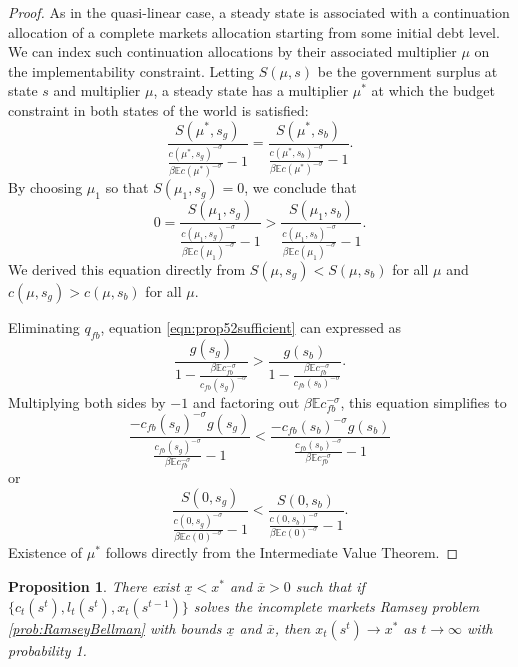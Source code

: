 \documentclass[12pt]{article}
\newcommand{\EE}{\mathbb E}
\newtheorem{proposition}[theorem]{Proposition}
\begin{document}
\begin{proof}As in the quasi-linear case, a steady state is associated with a continuation allocation of a complete markets allocation starting from  some initial debt level.  We can index such continuation allocations by their associated multiplier $\mu$ on the implementability constraint.  Letting $S(\mu,s)$ be the government surplus at state $s$ and multiplier $\mu$, a steady state has  a multiplier $\mu^*$ at which the budget constraint in both states of the world is satisfied:
\[
	\frac{S(\mu^*,s_g)}{\frac{c(\mu^*,s_g)^{-\sigma}}{\beta \EE c(\mu^*)^{-\sigma}}-1} =\frac{S(\mu^*,s_b)}{\frac{c(\mu^*,s_b)^{-\sigma}}{\beta \EE c(\mu^*)^{-\sigma}}-1}.
\]  By choosing $\mu_1$ so that $S(\mu_1,s_g) =0$, we conclude that
\[
	0 = \frac{S(\mu_1,s_g)}{\frac{c(\mu_1,s_g)^{-\sigma}}{\beta \EE c(\mu_1)^{-\sigma}}-1} > \frac{S(\mu_1,s_b)}{\frac{c(\mu_1,s_b)^{-\sigma}}{\beta \EE c(\mu_1)^{-\sigma}}-1}.
\]  We derived this equation directly from $S(\mu,s_g) < S(\mu,s_b)$ for all $\mu$ and $c(\mu,s_g) > c(\mu,s_b)$ for all $\mu$.

Eliminating  $q_{fb}$, equation \eqref{eqn:prop52sufficient} can expressed as
\[
	\frac{g(s_g)}{1-\frac{\beta\EE c_{fb}^{-\sigma}}{c_{fb}(s_g)^{-\sigma}}} > \frac{g(s_b)}{1-\frac{\beta\EE c_{fb}^{-\sigma}}{c_{fb}(s_b)^{-\sigma}}}.
\]  Multiplying both sides by $-1$ and factoring out  $\beta\EE c_{fb}^{-\sigma}$, this equation simplifies to
\[
	\frac{-c_{fb}(s_g)^{-\sigma}g(s_g) }{\frac{c_{fb}(s_g)^{-\sigma}}{\beta \EE c_{fb}^{-\sigma}}-1} < \frac{-c_{fb}(s_b)^{-\sigma}g(s_b) }{\frac{c_{fb}(s_b)^{-\sigma}}{\beta \EE c_{fb}^{-\sigma}}-1}
\]or
\[
	\frac{S(0,s_g)}{\frac{c(0,s_g)^{-\sigma}}{\beta \EE c(0)^{-\sigma}}-1} <\frac{S(0,s_b)}{\frac{c(0,s_b)^{-\sigma}}{\beta \EE c(0)^{-\sigma}}-1}.
\]  Existence of $\mu^*$ follows directly from the Intermediate Value Theorem.
\end{proof}


	\begin{proposition}\label{prop:convergenceU}
  There exist $\underline x < x^*$ and $\overline x >0$ such that if $\{c_t(s^t), l_t(s^t), x_t(s^{t-1})\}$ solves the incomplete markets Ramsey problem \ref{prob:RamseyBellman} with bounds $\underline x$ and $\overline x$, then $x_t(s^t)\rightarrow x^*$ as $t\rightarrow\infty$ with probability 1.

	\end{proposition}
\end{document}
